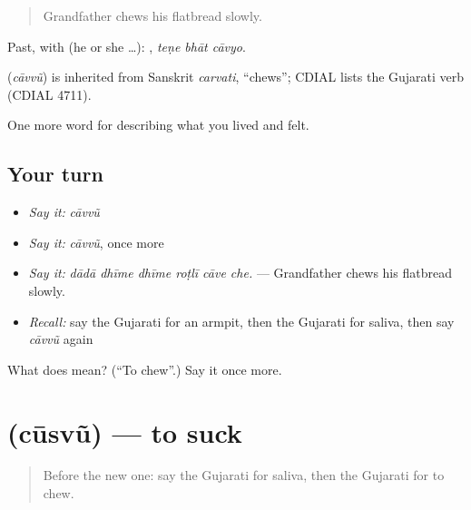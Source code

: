 \begin{quote}
Grandfather chews his flatbread slowly.
\end{quote}

Past, with  (he or she …):   , \emph{teṇe bhāt cāvyo}.

\begin{cousinweb}
\textbf{} (\emph{cāvvũ}) is inherited from Sanskrit \emph{carvati}, \textquotedblleft{}chews\textquotedblright{}; CDIAL lists the Gujarati verb (CDIAL 4711).
\end{cousinweb}

\begin{grammarlens}[title={What you've built}]
One more word for describing what you lived and felt.
\end{grammarlens}

\subsection*{Your turn}
\begin{itemize}
\raggedright
  \item \emph{Say it:} \emph{cāvvũ}
  \item \emph{Say it:} \emph{cāvvũ}, once more
  \item \emph{Say it:} \emph{dādā dhīme dhīme roṭlī cāve che.} — Grandfather chews his flatbread slowly.
  \item \emph{Recall:} say the Gujarati for an armpit, then the Gujarati for saliva, then say \emph{cāvvũ} again
\end{itemize}

\begin{tcolorbox}[breakable,colback=teal!4,colframe=teal!35!black,title={Before you move on}]
What does  mean? (\textquotedblleft{}To chew\textquotedblright{}.) Say it once more.
\end{tcolorbox}
\section[\texorpdfstring{\gu{ચૂસવું} (cūsvũ)}{ચૂસવું (cūsvũ)}]{ (cūsvũ) — to suck}

\label{lesson:GU-C474-cusvu}



\begin{quote}
Before the new one: say the Gujarati for saliva, then the Gujarati for to chew.
\end{quote}

